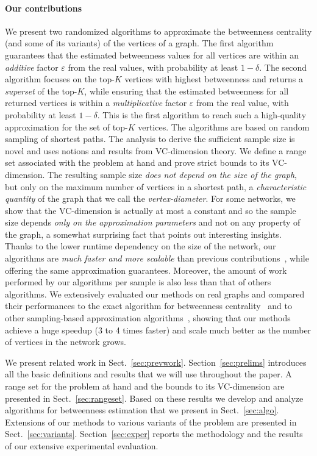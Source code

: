 \paragraph*{Our contributions} 
We present two randomized algorithms to approximate the betweenness centrality
(and some of its variants) of the vertices of a graph. The first algorithm
guarantees that the estimated betweenness values for all vertices are within an
\emph{additive} factor $\varepsilon$ from the real values, with probability at
least $1-\delta$. The second algorithm focuses on the top-$K$ vertices with
highest betweenness and returns a \emph{superset} of the top-$K$,
while ensuring that the estimated betweenness for all returned vertices is
within a \emph{multiplicative} factor $\varepsilon$ from the real value, with
probability at least $1-\delta$. This is the first algorithm to reach such a
high-quality approximation for the set of top-$K$ vertices. The algorithms are
based on random sampling of shortest paths. The analysis to derive the
sufficient sample size is novel and uses notions and results from VC-dimension
theory. We define a range set associated with the problem at hand and prove strict
bounds to its VC-dimension. The resulting sample size \emph{does not
depend on the size of the graph}, but only on the maximum number of vertices
in a shortest path, a \emph{characteristic quantity} of the graph that we call
the \emph{vertex-diameter}. For some networks, we show that the VC-dimension is
actually
at most a constant and so the sample size depends \emph{only on the approximation
parameters} and not on any property of the graph, a somewhat surprising fact
that points out interesting insights. Thanks to the lower runtime dependency on
the size of the network, our algorithms are \emph{much faster and more scalable}
than previous contributions~\citep{JacobKLPT05,BrandesP07,GeisbergerSS08}, while
offering the same approximation guarantees. Moreover, the amount of work
performed by our algorithms per sample is also less than that of others algorithms.
We extensively evaluated our methods on real graphs and compared their
performances to the exact algorithm for betweenness centrality~\citep{Brandes01}
and to other sampling-based approximation
algorithms~\citep{JacobKLPT05,BrandesP07,GeisbergerSS08}, showing that our
methods achieve a huge speedup (3 to 4 times faster) and scale much better as
the number of vertices in the network grows.

We present related work in Sect.~\ref{sec:prevwork}. Section~\ref{sec:prelims}
introduces all the basic definitions and results that we will use throughout the
paper. A range set for the problem at hand and the bounds to its VC-dimension
are presented in Sect.~\ref{sec:rangeset}. Based on these results we develop and
analyze algorithms for betweenness estimation that we present in
Sect.~\ref{sec:algo}. %
\ifproof
Extensions of our methods to various variants of the problem are presented in
Sect.~\ref{sec:variants}. %
\fi 
Section~\ref{sec:exper} reports the methodology and
the results of our extensive experimental evaluation.

